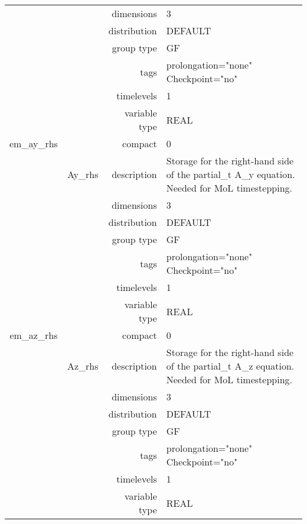 \begin{tabular*}{150mm}{|c|c@{\extracolsep{\fill}}|rl|}
 &  & dimensions & 3 \\ 
 &  & distribution & DEFAULT \\ 
 &  & group type & GF \\ 
 &  & tags & prolongation="none" Checkpoint="no" \\ 
 &  & timelevels & 1 \\ 
 &  & variable type & REAL \\ 
\hline 
em\_ay\_rhs &  & compact & 0 \\ 
 & Ay\_rhs & description & Storage for the right-hand side of the partial\_t A\_y equation. Needed for MoL timestepping. \\ 
 &  & dimensions & 3 \\ 
 &  & distribution & DEFAULT \\ 
 &  & group type & GF \\ 
 &  & tags & prolongation="none" Checkpoint="no" \\ 
 &  & timelevels & 1 \\ 
 &  & variable type & REAL \\ 
\hline 
em\_az\_rhs &  & compact & 0 \\ 
 & Az\_rhs & description & Storage for the right-hand side of the partial\_t A\_z equation. Needed for MoL timestepping. \\ 
 &  & dimensions & 3 \\ 
 &  & distribution & DEFAULT \\ 
 &  & group type & GF \\ 
 &  & tags & prolongation="none" Checkpoint="no" \\ 
 &  & timelevels & 1 \\ 
 &  & variable type & REAL \\ 
\hline 
\end{tabular*} 



\vspace{5mm}
\vspace{5mm}


